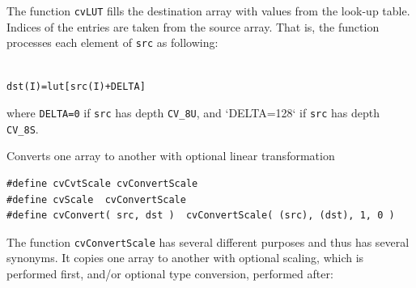 \begin{description}
\end{description}

The function \texttt{cvLUT} fills the destination array with values from the look-up table. Indices of the entries are taken from the source array. That is, the function processes each element of \texttt{src} as following:

\begin{lstlisting}

dst(I)=lut[src(I)+DELTA]

\end{lstlisting}

where \texttt{DELTA=0} if \texttt{src} has depth \texttt{CV\_8U}, and `DELTA=128` if \texttt{src} has depth \texttt{CV\_8S}.

\label{ConvertScale}

Converts one array to another with optional linear transformation


\begin{lstlisting}
#define cvCvtScale cvConvertScale
#define cvScale  cvConvertScale
#define cvConvert( src, dst )  cvConvertScale( (src), (dst), 1, 0 )
\end{lstlisting}

\begin{description}
\end{description}


The function \texttt{cvConvertScale} has several different purposes and thus has several synonyms. It copies one array to another with optional scaling, which is performed first, and/or optional type conversion, performed after:

